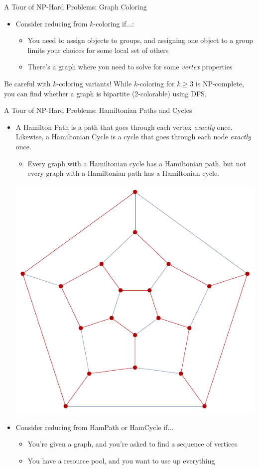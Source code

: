 \documentclass{beamer}
\begin{document}
\begin{frame}[t]{A Tour of NP-Hard Problems: Graph Coloring}
\begin{itemize}
\begin{center}
\begin{overprint}[.2\textwidth]
            \end{overprint}
        \end{center}
        \item \pause \pause Consider reducing from $k$-coloring if$\dotsc$:
        \begin{itemize}
             \item \pause You need to assign objects to groups, and assigning one object to a group limits your choices for some local set of others
             \item \pause There's a graph where you need to solve for some \textit{vertex} properties
        \end{itemize}
        \end{itemize}
        \pause
        \begin{alertblock}{Be careful with $k$-coloring variants!}
            While $k$-coloring for $k \geq 3$ is NP-complete, you can find whether a graph is bipartite (2-colorable) using DFS.
        \end{alertblock}
    
\end{frame}

\begin{frame}[t]{A Tour of NP-Hard Problems: Hamiltonian Paths and Cycles}
    \begin{itemize}
        \item A \alert{Hamilton Path} is a path that goes through each vertex \textit{exactly} once. Likewise, a \alert{Hamiltonian Cycle} is a cycle that goes through each node \textit{exactly} once.
        \begin{itemize}
            \item Every graph with a Hamiltonian cycle has a Hamiltonian path, but not every graph with a Hamiltonian path has a Hamiltonian cycle.
        \end{itemize}
        \begin{center}
            \includegraphics[height=.3\linewidth]{hamcycle.pdf}
        \end{center}
        \item \pause Consider reducing from \alert{HamPath} or \alert{HamCycle} if$\dotsc$
        \begin{itemize}
            \item \pause You're given a graph, and you're asked to find a sequence of vertices
            \item \pause You have a resource pool, and you want to use up everything
        \end{itemize}
    \end{itemize}
\end{frame}
\end{document}
